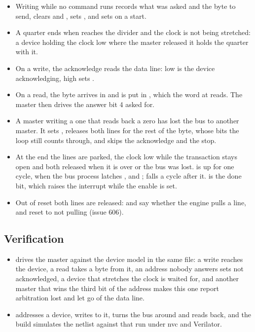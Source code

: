 \begin{itemize}
\item Writing  while no command runs records what was asked
and the byte to send, clears  and ,
sets , and sets  on a start.
\item A quarter ends when  reaches the divider and the
clock is not being stretched: a device holding the clock low where
the master released it holds the quarter with it.
\item On a write, the acknowledge reads the data line: low is the
device acknowledging, high sets .
\item On a read, the byte arrives in  and is put in
, which the word at  reads. The master then
drives the answer bit 4 asked for.
\item A master writing a one that reads back a zero has lost the bus
to another master. It sets , releases both lines for
the rest of the byte, whose bits the loop still counts through, and
skips the acknowledge and the stop.
\item At the end the lines are parked, the clock low while the
transaction stays open and both released when it is over or the bus
was lost.  is up for one cycle, when the bus process
latches ,  and ;  falls a
cycle after it.  is the done bit, which raises the
interrupt while the enable is set.
\item Out of reset both lines are released:  and
 say whether the engine pulls a line, and reset to
not pulling (issue 606).
\end{itemize}

\subsection*{Verification}

\begin{itemize}
\item {} drives the master against the
device model in the same file: a write reaches the device, a read
takes a byte from it, an address nobody answers sets not acknowledged,
a device that stretches the clock is waited for, and another master
that wins the third bit of the address makes this one report
arbitration lost and let go of the data line.
\item {} addresses a device, writes to it,
turns the bus around and reads back, and the build simulates the
netlist against that run under nvc and Verilator.
\end{itemize}

